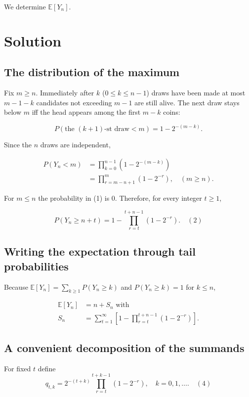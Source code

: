 \documentclass[12pt,a4paper]{article}
\theoremstyle{definition}
\begin{document}
We determine $\mathbb{E}[Y_n]$.

\section*{Solution}

\subsection*{The distribution of the maximum}

Fix $m \geq n$.
Immediately after $k$ ($0 \leq k \leq n-1$) draws have been made at most $m-1-k$ candidates not exceeding $m-1$ are still alive.
The next draw stays below $m$ iff the head appears among the first $m-k$ coins:

\[
P(\text{the } (k+1)\text{-st draw} < m) = 1 - 2^{-(m-k)}.
\]

Since the $n$ draws are independent,

\begin{align}
P(Y_n < m) &= \prod_{k=0}^{n-1}(1 - 2^{-(m-k)}) \\
&= \prod_{r=m-n+1}^{m}(1 - 2^{-r}), \quad (m \geq n). \tag{1}
\end{align}

For $m \leq n$ the probability in (1) is 0.
Therefore, for every integer $t \geq 1$,

\[
P(Y_n \geq n+t) = 1 - \prod_{r=t}^{t+n-1}(1 - 2^{-r}). \quad {(2)}
\]

\subsection*{Writing the expectation through tail probabilities}

Because $\mathbb{E}[Y_n] = \sum_{k \geq 1} P(Y_n \geq k)$ and $P(Y_n \geq k) = 1$ for $k \leq n$,

\begin{align}
\mathbb{E}[Y_n] &= n + S_n \text{ with} \\
S_n &= \sum_{t=1}^{\infty} \left[1 - \prod_{r=t}^{t+n-1}(1 - 2^{-r})\right]. \tag{3}
\end{align}

\subsection*{A convenient decomposition of the summands}

For fixed $t$ define
\[
q_{t,k} = 2^{-(t+k)} \prod_{r=t}^{t+k-1}(1 - 2^{-r}), \quad k = 0, 1, \ldots. \quad {(4)}
\]
\end{document}
